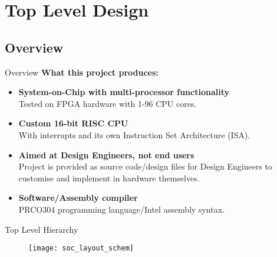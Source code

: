 \documentclass[aspectratio=169]{beamer}
\begin{document}
\section{Top Level Design}
\frame{\tableofcontents[currentsection, subsectionstyle=show/show/hide]}

\subsection{Overview}
\begin{frame}{Overview}
\textbf{What this project produces:}
\begin{itemize}[<+->]\setlength\itemsep{1em}
    \item{\textbf{System-on-Chip with multi-processor functionality}\\
    Tested on FPGA hardware with 1-96 CPU cores.}
    \item{\textbf{Custom 16-bit RISC CPU}\\
    With interrupts and its own Instruction Set Architecture (ISA).}
    \item{\textbf{Aimed at Design Engineers, not end users}\\
    Project is provided as source code/design files for Design Engineers to customise and implement in hardware themselves.}
    \item{\textbf{Software/Assembly compiler}\\
    PRCO304 programming language/Intel assembly syntax.}
\end{itemize}
\end{frame}

\begin{frame}{Top Level Hierarchy}
\vspace{-.3cm}
\begin{figure}
\texttt{[image: soc\_layout\_schem]}
\end{figure}
\end{frame}
\end{document}
